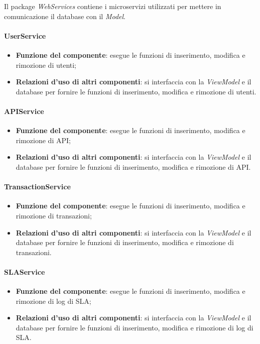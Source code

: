 Il package \textit{WebServices} contiene i microservizi utilizzati per mettere in comunicazione il database con il \textit{Model}.

\paragraph{UserService}
\begin{itemize}
	\item \textbf{Funzione del componente}: esegue le funzioni di inserimento, modifica e rimozione di utenti;
	\item \textbf{Relazioni d’uso di altri componenti}: si interfaccia con la \textit{ViewModel} e il database per fornire le funzioni di inserimento, modifica e rimozione di utenti.
\end{itemize}

\paragraph{APIService}
\begin{itemize}
	\item \textbf{Funzione del componente}: esegue le funzioni di inserimento, modifica e rimozione di API;
	\item \textbf{Relazioni d’uso di altri componenti}: si interfaccia con la \textit{ViewModel} e il database per fornire le funzioni di inserimento, modifica e rimozione di API.
\end{itemize}

\paragraph{TransactionService}
\begin{itemize}
	\item \textbf{Funzione del componente}: esegue le funzioni di inserimento, modifica e rimozione di transazioni;
	\item \textbf{Relazioni d’uso di altri componenti}: si interfaccia con la \textit{ViewModel} e il database per fornire le funzioni di inserimento, modifica e rimozione di transazioni.
\end{itemize}


\paragraph{SLAService}
\begin{itemize}
	\item \textbf{Funzione del componente}: esegue le funzioni di inserimento, modifica e rimozione di log di SLA;
	\item \textbf{Relazioni d’uso di altri componenti}: si interfaccia con la \textit{ViewModel} e il database per fornire le funzioni di inserimento, modifica e rimozione di log di SLA.
\end{itemize}

